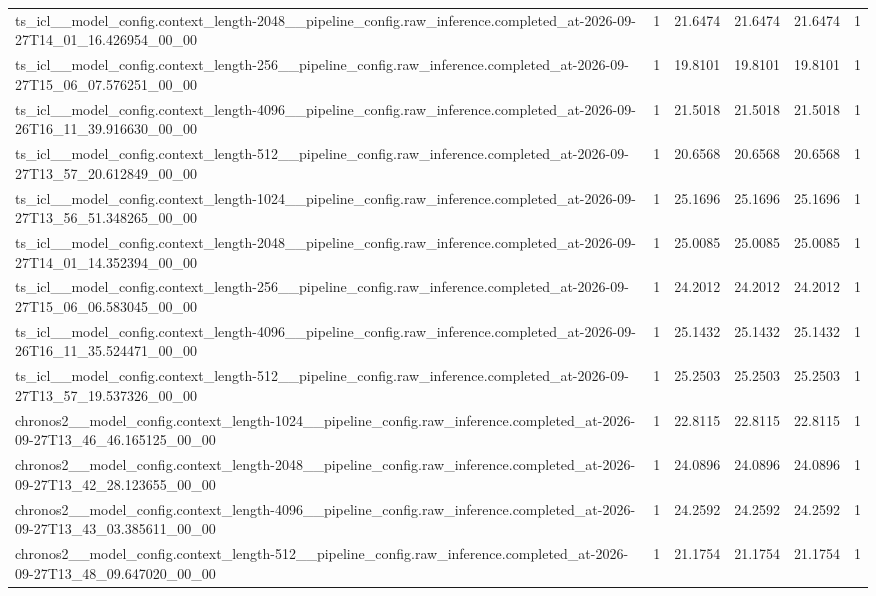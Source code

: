 \begin{tabular}{llllll}
ts\_icl\_\_model\_config.context\_length-2048\_\_pipeline\_config.raw\_inference.completed\_at-2026-09-27T14\_01\_16.426954\_00\_00 & 1 & 21.6474 & 21.6474 & 21.6474 & 1 \\
ts\_icl\_\_model\_config.context\_length-256\_\_pipeline\_config.raw\_inference.completed\_at-2026-09-27T15\_06\_07.576251\_00\_00 & 1 & 19.8101 & 19.8101 & 19.8101 & 1 \\
ts\_icl\_\_model\_config.context\_length-4096\_\_pipeline\_config.raw\_inference.completed\_at-2026-09-26T16\_11\_39.916630\_00\_00 & 1 & 21.5018 & 21.5018 & 21.5018 & 1 \\
ts\_icl\_\_model\_config.context\_length-512\_\_pipeline\_config.raw\_inference.completed\_at-2026-09-27T13\_57\_20.612849\_00\_00 & 1 & 20.6568 & 20.6568 & 20.6568 & 1 \\
ts\_icl\_\_model\_config.context\_length-1024\_\_pipeline\_config.raw\_inference.completed\_at-2026-09-27T13\_56\_51.348265\_00\_00 & 1 & 25.1696 & 25.1696 & 25.1696 & 1 \\
ts\_icl\_\_model\_config.context\_length-2048\_\_pipeline\_config.raw\_inference.completed\_at-2026-09-27T14\_01\_14.352394\_00\_00 & 1 & 25.0085 & 25.0085 & 25.0085 & 1 \\
ts\_icl\_\_model\_config.context\_length-256\_\_pipeline\_config.raw\_inference.completed\_at-2026-09-27T15\_06\_06.583045\_00\_00 & 1 & 24.2012 & 24.2012 & 24.2012 & 1 \\
ts\_icl\_\_model\_config.context\_length-4096\_\_pipeline\_config.raw\_inference.completed\_at-2026-09-26T16\_11\_35.524471\_00\_00 & 1 & 25.1432 & 25.1432 & 25.1432 & 1 \\
ts\_icl\_\_model\_config.context\_length-512\_\_pipeline\_config.raw\_inference.completed\_at-2026-09-27T13\_57\_19.537326\_00\_00 & 1 & 25.2503 & 25.2503 & 25.2503 & 1 \\
chronos2\_\_model\_config.context\_length-1024\_\_pipeline\_config.raw\_inference.completed\_at-2026-09-27T13\_46\_46.165125\_00\_00 & 1 & 22.8115 & 22.8115 & 22.8115 & 1 \\
chronos2\_\_model\_config.context\_length-2048\_\_pipeline\_config.raw\_inference.completed\_at-2026-09-27T13\_42\_28.123655\_00\_00 & 1 & 24.0896 & 24.0896 & 24.0896 & 1 \\
chronos2\_\_model\_config.context\_length-4096\_\_pipeline\_config.raw\_inference.completed\_at-2026-09-27T13\_43\_03.385611\_00\_00 & 1 & 24.2592 & 24.2592 & 24.2592 & 1 \\
chronos2\_\_model\_config.context\_length-512\_\_pipeline\_config.raw\_inference.completed\_at-2026-09-27T13\_48\_09.647020\_00\_00 & 1 & 21.1754 & 21.1754 & 21.1754 & 1 \\

\end{tabular}

